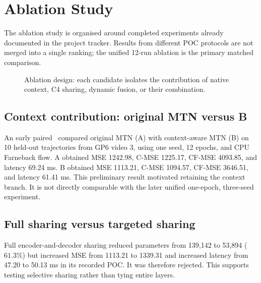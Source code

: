 \section{Ablation Study}
\label{sec:ablation}

The ablation study is organised around completed experiments already documented in the project tracker. Results from different POC protocols are not merged into a single ranking; the unified 12-run ablation is the primary matched comparison.

\begin{figure}[t]
\centering
\resizebox{\textwidth}{!}{}
\caption{Ablation design: each candidate isolates the contribution of native context, C4 sharing, dynamic fusion, or their combination.}
\label{fig:ablation-design}
\end{figure}

\subsection{Context contribution: original MTN versus B}
An early paired \poc\ compared original MTN (A) with context-aware MTN (B) on 10 held-out trajectories from GP6 video 3, using one seed, 12 epochs, and CPU Farneback flow. A obtained MSE 1242.98, C-MSE 1225.17, CF-MSE 4093.85, and latency 69.24 ms. B obtained MSE 1113.21, C-MSE 1094.57, CF-MSE 3646.51, and latency 61.41 ms. This preliminary result motivated retaining the context branch. It is not directly comparable with the later unified one-epoch, three-seed experiment.

\subsection{Full sharing versus targeted sharing}
Full encoder-and-decoder sharing reduced parameters from 139,142 to 53,894 ($61.3\%$) but increased MSE from 1113.21 to 1339.31 and increased latency from 47.20 to 50.13 ms in its recorded POC. It was therefore rejected. This supports testing selective sharing rather than tying entire layers.

